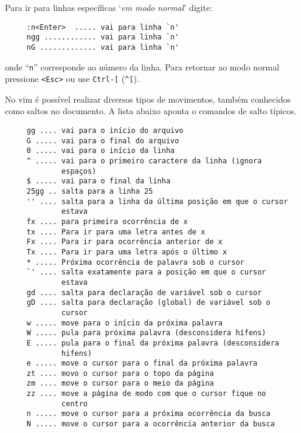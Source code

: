 Para ir para linhas específicas `{\em em modo normal}' digite:
\begin{verbatim}
     :n<Enter>  ..... vai para linha `n'
     ngg ............ vai para linha `n'
     nG ............. vai para linha `n'
\end{verbatim}
onde ``\verb|n|'' corresponde ao número da linha.  Para retornar ao modo normal
pressione \verb|<Esc>| ou use \verb|Ctrl-[| (\verb|^[|).

No vim é possível realizar diversos tipos de movimentos, também conhecidos como saltos no 
documento. A lista abaixo aponta o comandos de salto típicos.
\begin{verbatim}
     gg .... vai para o início do arquivo
     G ..... vai para o final do arquivo
     0 ..... vai para o início da linha
     ^ ..... vai para o primeiro caractere da linha (ignora 
             espaços)
     $ ..... vai para o final da linha
     25gg .. salta para a linha 25
     '' .... salta para a linha da última posição em que o cursor
             estava
     fx .... para primeira ocorrência de x
     tx .... Para ir para uma letra antes de x
     Fx .... Para ir para ocorrência anterior de x
     Tx .... Para ir para uma letra após o último x
     * ..... Próxima ocorrência de palavra sob o cursor
     `' .... salta exatamente para a posição em que o cursor
             estava
     gd .... salta para declaração de variável sob o cursor
     gD .... salta para declaração (global) de variável sob o 
             cursor
     w ..... move para o início da próxima palavra
     W ..... pula para próxima palavra (desconsidera hífens)
     E ..... pula para o final da próxima palavra (desconsidera 
             hifens)
     e ..... move o cursor para o final da próxima palavra
     zt .... movo o cursor para o topo da página
     zm .... move o cursor para o meio da página
     zz .... move a página de modo com que o cursor fique no 
             centro
     n ..... move o cursor para a próxima ocorrência da busca
     N ..... move o cursor para a ocorrência anterior da busca
\end{verbatim}


